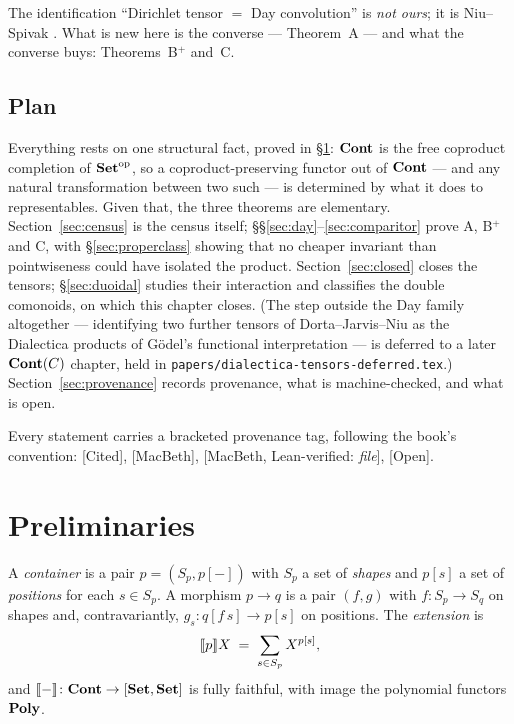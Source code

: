The identification ``Dirichlet tensor $=$ Day convolution'' is \emph{not ours};
it is Niu--Spivak \cite[Prop.~3.79]{NiuSpivak}. What is new here is the converse
--- Theorem~A --- and what the converse buys: Theorems~B$^+$ and~C.

\subsection*{Plan}

Everything rests on one structural fact, proved in §\ref{sec:prelim}: $\mathbf{Cont}$ is
the free coproduct completion of $\mathbf{Set}^{\mathrm{op}}$, so a coproduct-preserving
functor out of $\mathbf{Cont}$ --- and any natural transformation between two such --- is
determined by what it does to representables. Given that, the three theorems are
elementary. Section~\ref{sec:census} is the census itself;
§§\ref{sec:day}--\ref{sec:comparitor} prove A, B$^+$ and C, with
§\ref{sec:properclass} showing that no cheaper invariant than pointwiseness
could have isolated the product. Section~\ref{sec:closed} closes the tensors;
§\ref{sec:duoidal} studies their interaction and classifies the double
comonoids, on which this chapter closes. (The step outside the Day family
altogether --- identifying two further tensors of Dorta--Jarvis--Niu as the
Dialectica products of Gödel's functional interpretation --- is deferred to a
later $\mathbf{Cont}(C)$ chapter, held in
\texttt{papers/dialectica-tensors-deferred.tex}.) Section~\ref{sec:provenance}
records provenance, what is machine-checked, and what is open.

Every statement carries a bracketed provenance tag, following the book's
convention: \textsf{[Cited]}, \textsf{[MacBeth]}, \textsf{[MacBeth,
Lean-verified: \emph{file}]}, \textsf{[Open]}.

\section{Preliminaries}
\label{sec:prelim}

\begin{Definition}\label{def:container}
A \emph{container} is a pair $p=(S_p, p[-])$ with $S_p$ a set of \emph{shapes}
and $p[s]$ a set of \emph{positions} for each $s\in S_p$. A morphism
$p\to q$ is a pair $(f,g)$ with $f\colon S_p\to S_q$ on shapes and, contravariantly,
$g_s\colon q[f\,s]\to p[s]$ on positions. The \emph{extension} is
\[
   \llbracket p \rrbracket X \;=\; \sum_{s\in S_p} X^{p[s]},
\]
and $\llbracket - \rrbracket\colon\mathbf{Cont}\to[\mathbf{Set},\mathbf{Set}]$ is fully faithful, with image the
polynomial functors $\mathbf{Poly}$.
\end{Definition}

